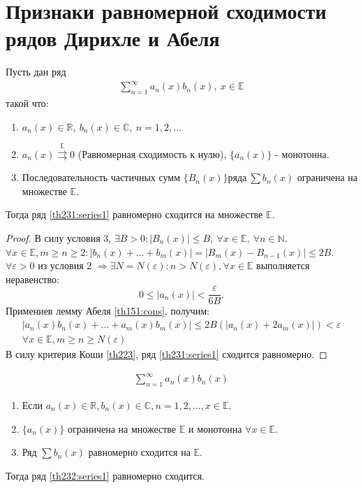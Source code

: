 \section{Признаки равномерной сходимости рядов Дирихле и Абеля}
\begin{theorem}
  Пусть дан ряд
  \begin{gather}
    \sum\limits_{n = 1}^{\infty} a_n(x) b_n(x), \ x \in \mathbb{E} \label{th231:series1}
  \end{gather}
  такой что:
  \begin{enumerate}
    \item $a_n(x) \in \mathbb{R}, \ b_n(x) \in \mathbb{C}, \ n = 1, 2, \dots$
    \item $a_n(x) \stackrel{\mathrm{\mathbb{E}}}{\rightrightarrows} 0$
      (Равномерная сходимость к нулю), $\{a_n(x)\}$ - монотонна.
    \item Последовательность частичных сумм $\{B_n(x)\} ряда \ \sum b_n(x)$ ограничена на множестве $\mathbb{E}$.
  \end{enumerate}
  Тогда ряд \eqref{th231:series1} равномерно сходится на множестве $\mathbb{E}$.
\end{theorem}

\begin{proof}
  В силу условия 3, $\exists B > 0: |B_n(x)| \leq B, \ \forall x \in \mathbb{E}, \
  \forall n \in \mathbb{N}$. \\
  $\forall x \in \mathbb{E}, m \geq n \geq 2: |b_n(x) + \dots + b_m(x)| =
  |B_m(x) - B_{n-1}(x)| \leq 2B$. \\
  $\forall \varepsilon > 0$ из условия 2 $\Rightarrow \exists N = N(\varepsilon):
  n > N(\varepsilon), \forall x \in \mathbb{E}$ выполняется неравенство:
  $$0 \leq |a_n(x)| < \frac{\varepsilon}{6B}.$$
  Примениев лемму Абеля \eqref{th151:cons}, получим:
  \begin{gather*}
    |a_n(x) b_n(x) + \dots + a_m(x) b_m(x)| \leq 2B(|a_n(x) + 2a_m(x)|) < \varepsilon \\ 
    \forall x \in \mathbb{E},
    m \geq n \geq N(\varepsilon)
  \end{gather*}
  В силу критерия Коши \eqref{th223}, ряд \eqref{th231:series1} сходится равномерно.
\end{proof}

\begin{theorem}
  \label{th232}
  \begin{gather}
    \sum\limits_{n = 1}^{\infty} a_n(x) b_n(x) \label{th232:series1}
  \end{gather}
  \begin{enumerate}
    \item Если $a_n(x) \in \mathbb{R}, b_n(x) \in \mathbb{C}, n = 1, 2, \dots,
      x \in \mathbb{E}$.
    \item $\{a_n(x)\}$ ограничена на множестве $\mathbb{E}$ и монотонна
      $\forall x \in \mathbb{E}$.
    \item Ряд $\sum b_n(x)$ равномерно сходится на $\mathbb{E}$.
  \end{enumerate}
  Тогда ряд \eqref{th232:series1} равномерно сходится.
\end{theorem}

